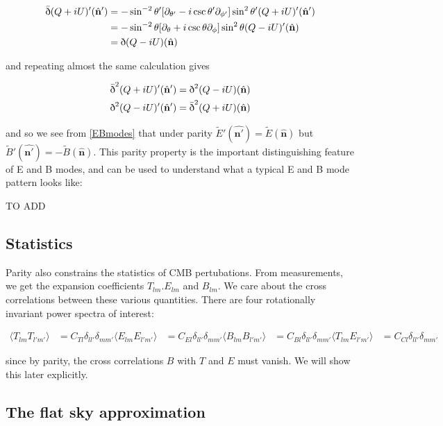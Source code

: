 \documentclass[a4paper,11pt]{article}
\renewcommand{\v}[1]{\mathbf{#1}}
\newcommand{\unit}[1]{\hat{\v{#1}}}
\newcommand{\sr}{\text{\normalfont\dh}}
\renewcommand{\sl}{\bar{\text{\normalfont\dh}}}
\begin{document}
\begin{align}
\sl(Q+iU)'(\unit{n}') &= -\sin^{-2}{\theta'}[\partial_{\theta'}-i\csc{\theta'}\partial_{\phi'}]\sin^{2}{\theta'}(Q+iU)'(\unit{n}')\\
&= -\sin^{-2}{\theta}[\partial_{\theta}+i\csc{\theta}\partial_{\phi}]\sin^{2}{\theta}(Q-iU)'(\unit{n})\\
&= \sr (Q-iU)(\unit{n})
\end{align}

and repeating almost the same calculation gives 

\begin{align}
\sl^2(Q+iU)'(\unit{n}') = \sr^2 (Q-iU)(\unit{n})\\
\sr^2(Q-iU)'(\unit{n}') = \sl^2 (Q+iU)(\unit{n})
\end{align}

and so we see from \ref{EBmodes} that under parity $\tilde{E}'(\unit{n'})=\tilde{E}(\unit{n})$ but $\tilde{B}'(\unit{n'})=-\tilde{B}(\unit{n})$. This parity property is the important distinguishing feature of E and B modes, and can be used to understand what a typical E and B mode pattern looks like:

TO ADD

\subsection{Statistics}
Parity also constrains the statistics of CMB pertubations. From measurements, we get the expansion coefficients $T_{lm}. E_{lm}$ and $B_{lm}$. We care about the cross correlations between these various quantities. There are four rotationally invariant power spectra of interest:

\begin{align}
\langle T_{lm}T_{l'm'} \rangle &= C_{Tl}\delta_{ll'}\delta_{mm'}
\langle E_{lm}E_{l'm'} \rangle &= C_{El}\delta_{ll'}\delta_{mm'}
\langle B_{lm}B_{l'm'} \rangle &= C_{Bl}\delta_{ll'}\delta_{mm'}
\langle T_{lm}E_{l'm'} \rangle &= C_{Cl}\delta_{ll'}\delta_{mm'}
\end{align}

since by parity, the cross correlations $B$ with $T$ and $E$ must vanish. We will show this later explicitly. 





\subsection{The flat sky approximation}
\end{document}
